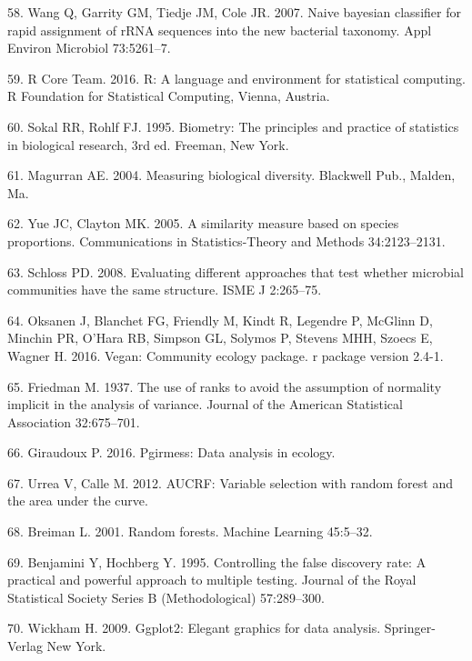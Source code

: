 \documentclass[11pt,]{article}
\begin{document}
\hypertarget{ref-wang_taxonomy_2007}{}
58. Wang Q, Garrity GM, Tiedje JM, Cole JR. 2007. Naive bayesian
classifier for rapid assignment of rRNA sequences into the new bacterial
taxonomy. Appl Environ Microbiol 73:5261--7.

\hypertarget{ref-R}{}
59. R Core Team. 2016. R: A language and environment for statistical
computing. R Foundation for Statistical Computing, Vienna, Austria.

\hypertarget{ref-sokal_biometrystats_1995}{}
60. Sokal RR, Rohlf FJ. 1995. Biometry: The principles and practice of
statistics in biological research, 3rd ed. Freeman, New York.

\hypertarget{ref-magurran_measuring_2004}{}
61. Magurran AE. 2004. Measuring biological diversity. Blackwell Pub.,
Malden, Ma.

\hypertarget{ref-yue_thetaYC_2005}{}
62. Yue JC, Clayton MK. 2005. A similarity measure based on species
proportions. Communications in Statistics-Theory and Methods
34:2123--2131.

\hypertarget{ref-schloss_commstruct_2008}{}
63. Schloss PD. 2008. Evaluating different approaches that test whether
microbial communities have the same structure. ISME J 2:265--75.

\hypertarget{ref-oksanen_vegan_2016}{}
64. Oksanen J, Blanchet FG, Friendly M, Kindt R, Legendre P, McGlinn D,
Minchin PR, O'Hara RB, Simpson GL, Solymos P, Stevens MHH, Szoecs E,
Wagner H. 2016. Vegan: Community ecology package. r package version
2.4-1.

\hypertarget{ref-friedman_1937}{}
65. Friedman M. 1937. The use of ranks to avoid the assumption of
normality implicit in the analysis of variance. Journal of the American
Statistical Association 32:675--701.

\hypertarget{ref-pgirmess}{}
66. Giraudoux P. 2016. Pgirmess: Data analysis in ecology.

\hypertarget{ref-AUCRF}{}
67. Urrea V, Calle M. 2012. AUCRF: Variable selection with random forest
and the area under the curve.

\hypertarget{ref-breiman_rf_2001}{}
68. Breiman L. 2001. Random forests. Machine Learning 45:5--32.

\hypertarget{ref-Benjamini_Hochberg_1995}{}
69. Benjamini Y, Hochberg Y. 1995. Controlling the false discovery rate:
A practical and powerful approach to multiple testing. Journal of the
Royal Statistical Society Series B (Methodological) 57:289--300.

\hypertarget{ref-ggplot2}{}
70. Wickham H. 2009. Ggplot2: Elegant graphics for data analysis.
Springer-Verlag New York.
\end{document}
